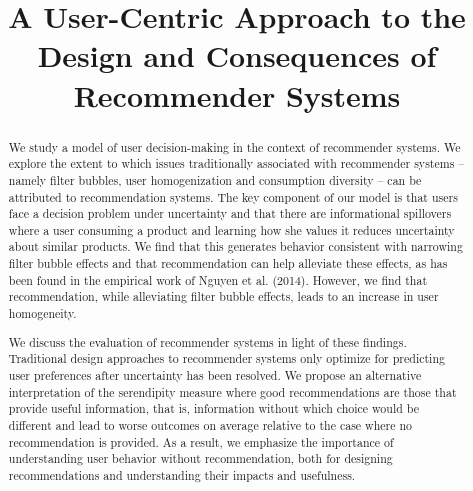 \documentclass[sigconf, anonymous, review]{acmart}
\begin{document}

%
\title{A User-Centric Approach to the Design and Consequences of Recommender Systems}
%

%
\begin{abstract}
We study a model of user decision-making in the context of recommender systems. We explore the extent to which issues traditionally associated with recommender systems -- namely filter bubbles, user homogenization and consumption diversity -- can be attributed to recommendation systems. The key component of our model is that users face a decision problem under uncertainty and that there are informational spillovers where a user consuming a product and learning how she values it reduces uncertainty about similar products. We find that this generates behavior consistent with narrowing filter bubble effects and that recommendation can help alleviate these effects, as has been found in the empirical work of Nguyen et al. (2014). However, we find that recommendation, while alleviating filter bubble effects, leads to an increase in user homogeneity.
\par

We discuss the evaluation of recommender systems in light of these findings. Traditional design approaches to recommender systems only optimize for predicting user preferences after uncertainty has been resolved. We propose an alternative interpretation of the serendipity measure where good recommendations are those that provide useful information, that is, information without which choice would be different and lead to worse outcomes on average relative to the case where no recommendation is provided. As a result, we emphasize the importance of understanding user behavior without recommendation, both for designing recommendations and understanding their impacts and usefulness.
\end{abstract}

%
%
\end{document}
